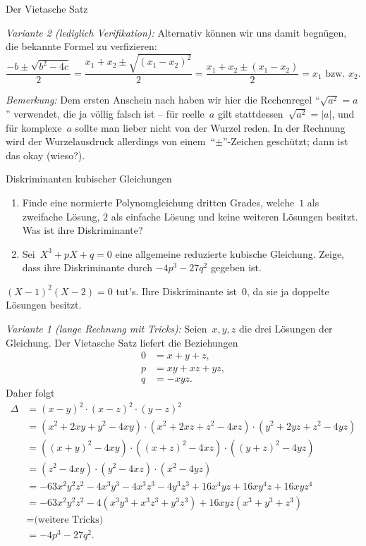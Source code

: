 \documentclass{algblatt}
\begin{document}
\begin{aufgabe}{Der Vietasche Satz}
\begin{loesungE}
\emph{Variante 2 (lediglich Verifikation):} Alternativ können wir uns damit
begnügen, die bekannte Formel zu verfizieren:
\[ \frac{-b \pm \sqrt{b^2 - 4c}}{2} =
  \frac{x_1 + x_2 \pm \sqrt{(x_1 - x_2)^2}}{2} =
  \frac{x_1 + x_2 \pm (x_1 - x_2)}{2} =
  \text{$x_1$ bzw. $x_2$}. \]

\emph{Bemerkung:} Dem ersten Anschein nach haben wir hier die Rechenregel
"`$\sqrt{a^2} = a$"' verwendet, die ja völlig falsch ist -- für reelle~$a$ gilt
stattdessen~$\sqrt{a^2} = |a|$, und für komplexe~$a$ sollte man lieber nicht
von der Wurzel reden. In der Rechnung wird der Wurzelausdruck allerdings von
einem~"`$\pm$"'-Zeichen geschützt; dann ist das okay (wieso?).
\end{loesungE}
\end{aufgabe}

\begin{aufgabe}{Diskriminanten kubischer Gleichungen}
\begin{enumerate}
\item Finde eine normierte Polynomgleichung dritten Grades, welche~$1$
als zweifache Lösung, $2$ als einfache Lösung und keine weiteren Lösungen
besitzt. Was ist ihre Diskriminante?
\item Sei~$X^3 + p X + q = 0$ eine allgemeine reduzierte kubische Gleichung.
Zeige, dass ihre Diskriminante durch $-4 p^3 - 27 q^2$ gegeben ist.
\end{enumerate}
\begin{loesungE}
\item $(X - 1)^2 (X - 2) = 0$ tut's. Ihre Diskriminante ist~$0$, da sie ja
doppelte Lösungen besitzt.

\item \emph{Variante 1 (lange Rechnung mit Tricks):} Seien~$x,y,z$ die drei Lösungen der
Gleichung. Der Vietasche Satz liefert die Beziehungen
\begin{align*}
  0 &= x+y+z, \\
  p &= xy + xz + yz, \\
  q &= -xyz.
\end{align*}
Daher folgt
\begin{align*}
  \Delta &= (x-y)^2 \cdot (x-z)^2 \cdot (y-z)^2 \\
  &= (x^2+2xy+y^2-4xy) \cdot (x^2+2xz+z^2-4xz) \cdot (y^2+2yz+z^2-4yz) \\
  &= ((x+y)^2-4xy) \cdot ((x+z)^2-4xz) \cdot ((y+z)^2-4yz) \\
  &= (z^2-4xy) \cdot (y^2-4xz) \cdot (x^2-4yz) \\
  &= -63x^2y^2z^2 -4x^3y^3 - 4x^3z^3 - 4y^3z^3 + 16x^4yz + 16xy^4z + 16xyz^4 \\
  &= -63x^2y^2z^2 - 4(x^3y^3 + x^3z^3 + y^3z^3) + 16 xyz (x^3+y^3+z^3) \\
  &= \text{(weitere Tricks)} \\
  &= -4p^3 - 27q^2.
\end{align*}


\end{loesungE}
\end{aufgabe}
\end{document}
